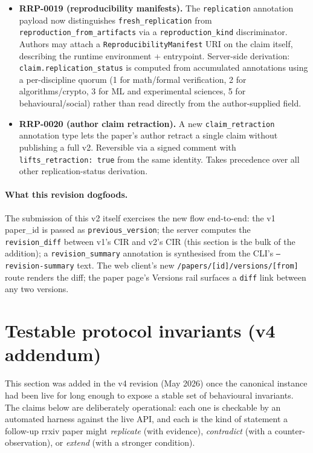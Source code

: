 \documentclass[11pt]{rrxiv}
\begin{document}
\begin{itemize}[leftmargin=*,itemsep=2pt]
  \item \textbf{RRP-0019 (reproducibility manifests).} The \texttt{replication} annotation payload now distinguishes \texttt{fresh\_replication} from \texttt{reproduction\_from\_artifacts} via a \texttt{reproduction\_kind} discriminator. Authors may attach a \texttt{ReproducibilityManifest} URI on the claim itself, describing the runtime environment + entrypoint. Server-side derivation: \texttt{claim.replication\_status} is computed from accumulated annotations using a per-discipline quorum (1 for math/formal verification, 2 for algorithms/crypto, 3 for ML and experimental sciences, 5 for behavioural/social) rather than read directly from the author-supplied field.
  \item \textbf{RRP-0020 (author claim retraction).} A new \texttt{claim\_retraction} annotation type lets the paper's author retract a single claim without publishing a full v2. Reversible via a signed comment with \texttt{lifts\_retraction: true} from the same identity. Takes precedence over all other replication-status derivation.
\end{itemize}

\paragraph{What this revision dogfoods.} The submission of this v2 itself exercises the new flow end-to-end: the v1 paper\_id is passed as \texttt{previous\_version}; the server computes the \texttt{revision\_diff} between v1's CIR and v2's CIR (this section is the bulk of the addition); a \texttt{revision\_summary} annotation is synthesised from the CLI's \texttt{--revision-summary} text. The web client's new \texttt{/papers/[id]/versions/[from]} route renders the diff; the paper page's Versions rail surfaces a \texttt{diff} link between any two versions.

\section{Testable protocol invariants (v4 addendum)}
\label{sec:testable-invariants}

This section was added in the v4 revision (May 2026) once the canonical instance had been live for long enough to expose a stable set of behavioural invariants. The claims below are deliberately operational: each one is checkable by an automated harness against the live API, and each is the kind of statement a follow-up rrxiv paper might \emph{replicate} (with evidence), \emph{contradict} (with a counter-observation), or \emph{extend} (with a stronger condition).
\end{document}
